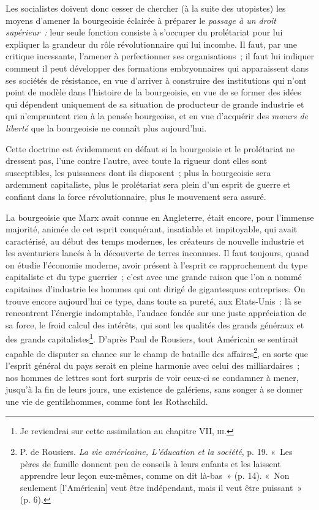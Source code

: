 \documentclass[french,twoside]{book} %
\begin{document}
Les socialistes doivent donc cesser de chercher (à la suite des utopistes) les moyens d’amener la bourgeoisie éclairée à préparer le \emph{passage à un droit supérieur :} leur seule fonction consiste à s’occuper du prolétariat pour lui expliquer la grandeur du rôle révolutionnaire qui lui incombe. Il faut, par une critique incessante, l’amener à perfectionner ses organisations ; il faut lui indiquer comment il peut développer des formations embryonnaires qui apparaissent dans ses sociétés de résistance, en vue d’arriver à construire des institutions qui n’ont point de modèle dans l’histoire de la bourgeoisie, en vue  de se former des idées qui dépendent uniquement de sa situation de producteur de grande industrie et qui n’empruntent rien à la pensée bourgeoise, et en vue d’acquérir des \emph{mœurs de liberté} que la bourgeoisie ne connaît plus aujourd’hui.\par
Cette doctrine est évidemment en défaut si la bourgeoisie et le prolétariat ne dressent pas, l’une contre l’autre, avec toute la rigueur dont elles sont susceptibles, les puissances dont ils disposent ; plus la bourgeoisie sera ardemment capitaliste, plus le prolétariat sera plein d’un esprit de guerre et confiant dans la force révolutionnaire, plus le mouvement sera assuré.\par
La bourgeoisie que Marx avait connue en Angleterre, était encore, pour l’immense majorité, animée de cet esprit conquérant, insatiable et impitoyable, qui avait caractérisé, au début des temps modernes, les créateurs de nouvelle industrie et les aventuriers lancés à la découverte de terres inconnues. Il faut toujours, quand on étudie l’économie moderne, avoir présent à l’esprit ce rapprochement du type capitaliste et du type guerrier ; c’est avec une grande raison que l’on a nommé capitaines d’industrie les hommes qui ont dirigé de gigantesques entreprises. On trouve encore aujourd’hui ce type, dans toute sa pureté, aux Etats-Unis : là se rencontrent l’énergie indomptable, l’audace fondée sur une juste appréciation de sa force, le froid calcul des intérêts, qui sont les qualités des grands généraux et des grands capitalistes\footnote{ \noindent Je reviendrai sur cette assimilation au chapitre VII, {\scshape iii}.
 }. D’après Paul de Rousiers, tout Américain se sentirait capable de disputer sa chance sur le  champ de bataille des affaires\footnote{ \noindent P. de Rousiers. \emph{La vie américaine, L’éducation et la société}, p. 19. « Les pères de famille donnent peu de conseils à leurs enfants et les laissent apprendre leur leçon eux-mêmes, comme on dit là-bas » (p. 14). « Non seulement [l’Américain] veut être indépendant, mais il veut être puissant » (p. 6).
 }, en sorte que l’esprit général du pays serait en pleine harmonie avec celui des milliardaires ; nos hommes de lettres sont fort surpris de voir ceux-ci se condamner à mener, jusqu’à la fin de leurs jours, une existence de galériens, sans songer à se donner une vie de gentilshommes, comme font les Rothschild.\par
\end{document}

